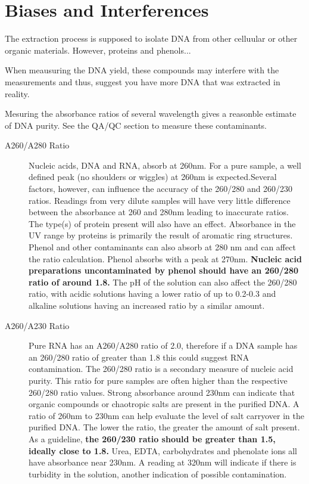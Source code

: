 \documentclass[12pt]{../SOP3_alpha}
\begin{document}
\section{Biases and Interferences}

\NP The extraction process is supposed to isolate DNA from other celluular or other organic materials. However, proteins and phenols...  

\NP When meausuring the DNA yield, these compounds may interfere with the measurements and thus, suggest you have more DNA that was extracted in reality. 

\NP Mesuring the absorbance ratios of several wavelength gives a reasonble estimate of DNA purity. See the QA/QC section to measure these contaminants.

\begin{description}
  \item[A260/A280 Ratio] Nucleic acids, DNA and RNA, absorb at 260nm. For a pure sample, a well defined peak (no shoulders or wiggles) at 260nm is expected.Several factors, however, can influence the accuracy of the 260/280 and 260/230 ratios. Readings from very dilute samples will have very little difference between the absorbance at 260 and 280nm leading to inaccurate ratios.  The type(s) of protein present will also have an effect.  Absorbance in the UV range by proteins is primarily the result of aromatic ring structures. Phenol and other contaminants can also absorb at 280 nm and can affect the ratio calculation. Phenol absorbs with a peak at 270nm. \textbf{Nucleic acid preparations uncontaminated by phenol should have an 260/280 ratio of around 1.8. } The pH of the solution can also affect the 260/280 ratio, with acidic solutions having a lower ratio of up to 0.2-0.3 and alkaline solutions having an increased ratio by a similar amount.
  \item[A260/A230 Ratio] Pure RNA has an A260/A280 ratio of 2.0, therefore if a DNA sample has an 260/280 ratio of greater than 1.8 this could suggest RNA contamination. The 260/280 ratio is a secondary measure of nucleic acid purity. This ratio for pure samples are often higher than the respective 260/280 ratio values. Strong absorbance around 230nm can indicate that organic compounds or chaotropic salts are present in the purified DNA.  A ratio of 260nm to 230nm can help evaluate the level of salt carryover in the purified DNA. The lower the ratio, the greater the amount of salt present. As a guideline, \textbf{the 260/230 ratio should be greater than 1.5, ideally close to 1.8.} Urea, EDTA, carbohydrates and phenolate ions all have absorbance near 230nm. A reading at 320nm will indicate if there is turbidity in the solution, another indication of possible contamination.  

\end{description}
\end{document}
